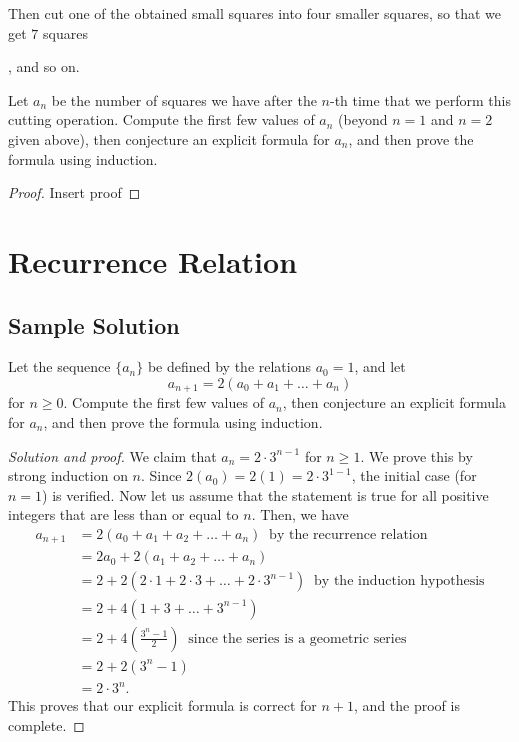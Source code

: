 \documentclass[10pt]{amsart}
\begin{document}
Then cut one of the obtained small squares into four smaller squares, so that we get $7$ squares 
 \hspace {-1cm}
, 
and so on.

Let $a_n$ be the number of squares we have after the $n$-th time that we perform this cutting operation. 
Compute the first few values of $a_n$ (beyond $n=1$ and $n=2$ given above), then conjecture an explicit formula for $a_n$, and then prove the formula using induction.
\begin{proof}
	Insert proof
\end{proof}


\section{Recurrence Relation}

\subsection{Sample Solution}
Let the sequence $\{ a_n\}$ be defined by the relations $a_0=1$, and let
\[
a_{n+1} = 2(a_0 + a_1 + \dots + a_n) 
\]
for $n \geq 0$. 
Compute the first few values of $a_n$, then conjecture an explicit formula for $a_n$, and then prove the formula using induction.
\begin{proof}[Solution and proof]
	We claim that $a_n = 2 \cdot 3^{n-1}$ for $n \geq 1$. We prove this by strong induction on $n$.
	Since $2(a_0)=2(1)=2\cdot 3^{1-1}$, the initial case (for $n=1$) is verified.  
	Now let us assume that the statement is true for all positive integers that are less than or equal to $n$. Then, we have
	\begin{align*}
		a_{n+1} &= 2(a_0 + a_1 + a_2 + \dots + a_n) ~ \text{ by the recurrence relation}\\
		&= 2 a_0 + 2 (a_1 + a_2 + \dots +  a_n)\\
		&= 2 + 2(2 \cdot 1 + 2 \cdot 3 + \dots + 2 \cdot 3^{n-1}) ~ \text{ by the induction hypothesis}\\
		&= 2 + 4 ( 1 +  3 + \dots +  3^{n-1})\\
		&= 2 + 4 \left( \frac{3^n - 1}{2}  \right) ~ \text{ since the series is a geometric series} \\
		&= 2 + 2 (3^n - 1) \\
		&= 2 \cdot 3^n.
	\end{align*}
	This proves that our explicit formula is correct for $n+1$, and the proof is complete.
\end{proof}
\end{document}
